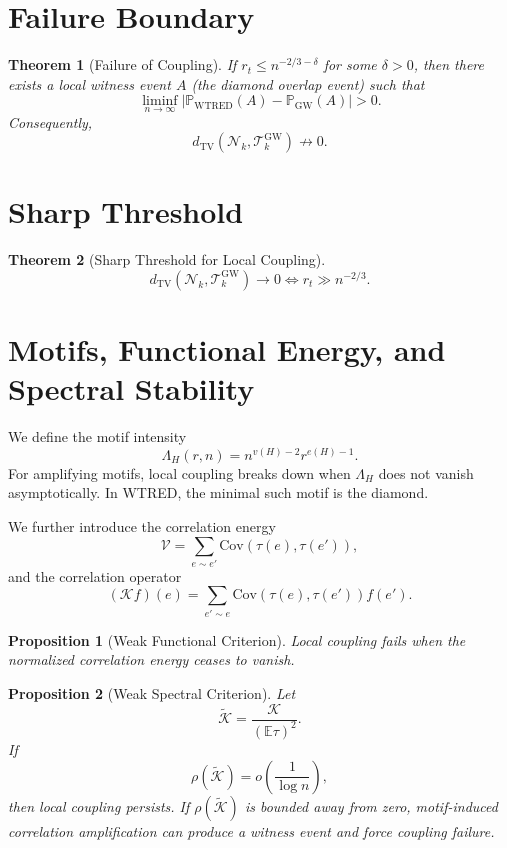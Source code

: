 \documentclass[11pt]{article}
\newtheorem{theorem}{Theorem}
\newtheorem{proposition}{Proposition}
\begin{document}
\section{Failure Boundary}
\begin{theorem}[Failure of Coupling]
If $r_t\le n^{-2/3-\delta}$ for some $\delta>0$, then there exists a local witness event $A$ (the diamond overlap event) such that
\[
\liminf_{n\to\infty}\left|\mathbb P_{\mathrm{WTRED}}(A)-\mathbb P_{\mathrm{GW}}(A)\right|>0.
\]
Consequently,
\[
d_{\mathrm{TV}}(\mathcal N_k,\mathcal T_k^{\mathrm{GW}})\not\to 0.
\]
\end{theorem}

\section{Sharp Threshold}
\begin{theorem}[Sharp Threshold for Local Coupling]
\[
d_{\mathrm{TV}}(\mathcal N_k,\mathcal T_k^{\mathrm{GW}})\to 0
\iff r_t\gg n^{-2/3}.
\]
\end{theorem}

\section{Motifs, Functional Energy, and Spectral Stability}
We define the motif intensity
\[
\Lambda_H(r,n)=n^{v(H)-2}r^{e(H)-1}.
\]
For amplifying motifs, local coupling breaks down when $\Lambda_H$ does not vanish asymptotically. In WTRED, the minimal such motif is the diamond.

We further introduce the correlation energy
\[
\mathcal V=\sum_{e\sim e'}\mathrm{Cov}(\tau(e),\tau(e')),
\]
and the correlation operator
\[
(\mathcal K f)(e)=\sum_{e'\sim e}\mathrm{Cov}(\tau(e),\tau(e'))f(e').
\]

\begin{proposition}[Weak Functional Criterion]
Local coupling fails when the normalized correlation energy ceases to vanish.
\end{proposition}

\begin{proposition}[Weak Spectral Criterion]
Let
\[
\widetilde{\mathcal K}=\frac{\mathcal K}{(\mathbb E\tau)^2}.
\]
If
\[
\rho(\widetilde{\mathcal K})=o\left(\frac{1}{\log n}\right),
\]
then local coupling persists. If $\rho(\widetilde{\mathcal K})$ is bounded away from zero, motif-induced correlation amplification can produce a witness event and force coupling failure.
\end{proposition}
\end{document}

